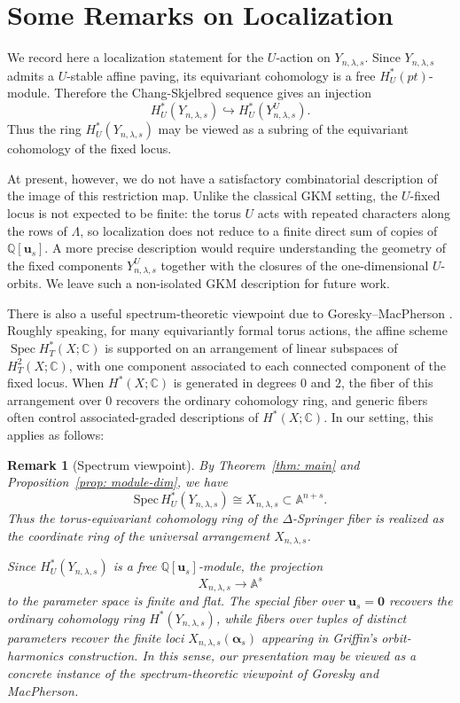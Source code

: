 \documentclass[11pt]{amsart}
\numberwithin{equation}{section}
\newtheorem{remark}[theorem]{Remark}
\theoremstyle{definition}
\newcommand{\CC}{{\mathbb{C}}}
\newcommand{\QQ}{{\mathbb{Q}}}
\newcommand{\uuu}{{\mathbf{u}}}
\newcommand{\aalpha}{{{\bm \alpha}}}
\DeclareMathOperator{\Spec}{Spec}
\begin{document}
\section{Some Remarks on Localization}

We record here a localization statement for the $U$-action on
$Y_{n,\lambda,s}$. Since $Y_{n,\lambda,s}$ admits a $U$-stable affine paving,
its equivariant cohomology is a free $H_U^*(pt)$-module. Therefore the
Chang-Skjelbred sequence \cite{CS} gives an injection
\[
H_U^*(Y_{n,\lambda,s}) \hookrightarrow H_U^*(Y_{n,\lambda,s}^U).
\]
Thus the ring $H_U^*(Y_{n,\lambda,s})$ may be viewed as a subring of the
equivariant cohomology of the fixed locus.

At present, however, we do not have a satisfactory combinatorial description of
the image of this restriction map. Unlike the classical GKM setting, the
$U$-fixed locus is not expected to be finite: the torus $U$ acts with repeated
characters along the rows of $\Lambda$, so localization does not reduce to a
finite direct sum of copies of $\QQ[\uuu_s]$. A more precise description would
require understanding the geometry of the fixed components
$Y_{n,\lambda,s}^U$ together with the closures of the one-dimensional
$U$-orbits. We leave such a non-isolated GKM description for future work.

There is also a useful spectrum-theoretic viewpoint due to
Goresky--MacPherson \cite{GM}. Roughly speaking, for many equivariantly formal torus
actions, the affine scheme $\Spec H_T^*(X;\CC)$ is supported on an arrangement
of linear subspaces of $H_T^2(X;\CC)$, with one component associated to each
connected component of the fixed locus. When $H^*(X;\CC)$ is generated in
degrees $0$ and $2$, the fiber of this arrangement over $0$ recovers the
ordinary cohomology ring, and generic fibers often control associated-graded
descriptions of $H^*(X;\CC)$. In our setting, this applies as follows:

\begin{remark}[Spectrum viewpoint]
By Theorem~\ref{thm: main} and Proposition~\ref{prop: module-dim}, we have
\[
\mathrm{Spec}\, H_U^*(Y_{n,\lambda,s}) \cong X_{n,\lambda,s}\subset \mathbb A^{n+s}.
\]
Thus the torus-equivariant cohomology ring of the $\Delta$-Springer fiber is
realized as the coordinate ring of the universal arrangement
$X_{n,\lambda,s}$.

Since $H_U^*(Y_{n,\lambda,s})$ is a free $\QQ[\uuu_s]$-module, the projection
\[
X_{n,\lambda,s}\longrightarrow \mathbb A^s
\]
to the parameter space is finite and flat. The special fiber over
$\uuu_s=\mathbf 0$ recovers the ordinary cohomology ring
$H^*(Y_{n,\lambda,s})$, while fibers over tuples of distinct parameters recover
the finite loci $X_{n,\lambda,s}(\aalpha_s)$ appearing in Griffin's
orbit-harmonics construction. In this sense, our presentation may be viewed as a
concrete instance of the spectrum-theoretic viewpoint of Goresky and
MacPherson.
\end{remark}
\end{document}
